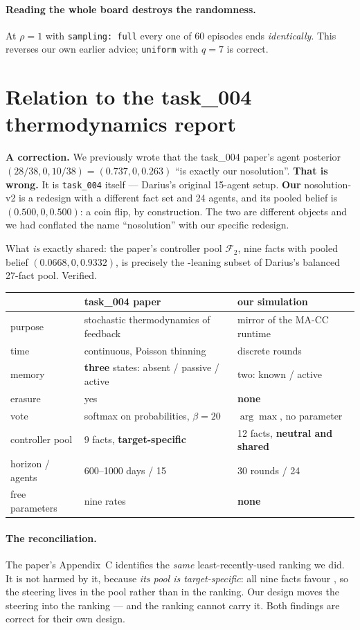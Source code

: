\documentclass[11pt,a4paper]{article}
\begin{document}
\paragraph{Reading the whole board destroys the randomness.} At $\rho=1$ with
\texttt{sampling: full} every one of 60 episodes ends \emph{identically}. This
reverses our own earlier advice; \texttt{uniform} with $q=7$ is correct.

\section{Relation to the task\_004 thermodynamics report}

\textbf{A correction.} We previously wrote that the task\_004 paper's agent
posterior $(28/38,0,10/38)=(0.737,0,0.263)$ ``is exactly our nosolution''.
\textbf{That is wrong.} It is \texttt{task\_004} itself --- Darius's original
15-agent setup. \textbf{Our} nosolution-v2 is a redesign with a different fact
set and 24 agents, and its pooled belief is $(0.500,0,0.500)$: a coin flip, by
construction. The two are different objects and we had conflated the name
``nosolution'' with our specific redesign.

What \emph{is} exactly shared: the paper's controller pool $\mathcal F_2$, nine
facts with pooled belief $(0.0668,0,0.9332)$, is precisely the -leaning
subset of Darius's balanced 27-fact pool. Verified.

\begin{center}\small
\begin{tabular}{p{3.4cm}p{5.2cm}p{5.2cm}}\toprule
 & \textbf{task\_004 paper} & \textbf{our simulation}\\\midrule
purpose & stochastic thermodynamics of feedback & mirror of the MA-CC runtime\\
time & continuous, Poisson thinning & discrete rounds\\
memory & \textbf{three} states: absent / passive / active & two: known / active\\
erasure & yes & \textbf{none}\\
vote & softmax on probabilities, $\beta=20$ & $\arg\max$, no parameter\\
controller pool & 9 facts, \textbf{target-specific} & 12 facts, \textbf{neutral and shared}\\
horizon / agents & 600--1000 days / 15 & 30 rounds / 24\\
free parameters & nine rates & \textbf{none}\\
\bottomrule\end{tabular}\end{center}

\paragraph{The reconciliation.} The paper's Appendix~C identifies the \emph{same}
least-recently-used ranking we did. It is not harmed by it, because \emph{its
pool is target-specific}: all nine facts favour , so the steering lives in
the pool rather than in the ranking. Our design moves the steering into the
ranking --- and the ranking cannot carry it. Both findings are correct for their
own design.
\end{document}
